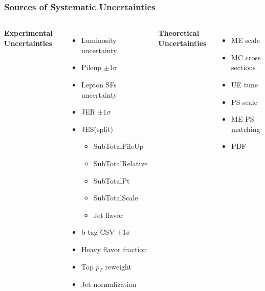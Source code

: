 \documentclass{beamer}
\begin{document}

\begin{frame}
\frametitle{Sources of Systematic Uncertainties}
\begin{columns}
	 \textbf{Experimental Uncertainties}
	\begin{itemize}
		\item Luminosity uncertainty
		\item Pileup $\pm 1 \sigma$
		\item Lepton SFs uncertainty
		\item JER $\pm 1 \sigma$
		\item JES(split) \begin{itemize}
			\item SubTotalPileUp
			\item SubTotalRelative
			\item SubTotalPt
			\item SubTotalScale
			\item Jet flavor \end{itemize}
		\item b-tag CSV $\pm 1 \sigma$
		\item Heavy flavor fraction
		\item Top $p_{T}$ reweight
		\item Jet normalization
	\end{itemize}
	 \textbf{Theoretical Uncertainties}
	\begin{itemize}
		\item ME scale
		\item MC cross sections
		\item UE tune
		\item PS scale
		\item ME-PS matching
		\item PDF
	\end{itemize}
\end{columns}
\end{frame}

\end{document}
